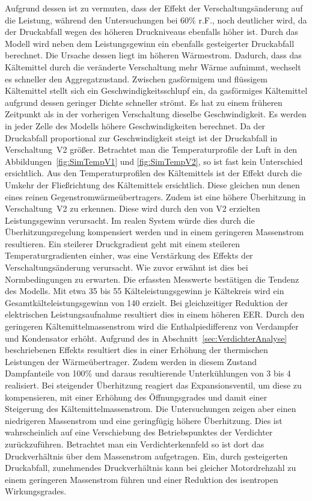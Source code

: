 Aufgrund dessen ist zu vermuten, dass der Effekt der Verschaltungsänderung auf die Leistung, während den Untersuchungen bei \unit{60}{\%} r.F., noch deutlicher wird, da der Druckabfall wegen des höheren Druckniveaus ebenfalls höher ist. Durch das Modell wird neben dem Leistungsgewinn ein ebenfalls gesteigerter Druckabfall berechnet. Die Ursache dessen liegt im höheren Wärmestrom. Dadurch, dass das Kältemittel durch die veränderte Verschaltung mehr Wärme aufnimmt, wechselt es schneller den Aggregatzustand. Zwischen gasförmigem und flüssigem Kältemittel stellt sich ein Geschwindigkeitsschlupf ein, da gasförmiges Kältemittel aufgrund dessen geringer Dichte schneller strömt. Es hat zu einem früheren Zeitpunkt als in der vorherigen Verschaltung dieselbe Geschwindigkeit. Es werden in jeder Zelle des Modells höhere Geschwindigkeiten berechnet. Da der Druckabfall proportional zur Geschwindigkeit steigt ist der Druckabfall in Verschaltung~V2 größer. \newline
Betrachtet man die Temperaturprofile der Luft in den Abbildungen~\ref{fig:SimTempV1} und \ref{fig:SimTempV2}, so ist fast kein Unterschied ersichtlich. Aus den Temperaturprofilen des Kältemittels ist der Effekt durch die Umkehr der Fließrichtung des Kältemittels ersichtlich. Diese gleichen nun denen eines reinen Gegenstromwärmeübertragers. Zudem ist eine höhere Überhitzung in Verschaltung~V2 zu erkennen. Diese wird durch den von V2 erzielten Leistungsgewinn verursacht. Im realen System würde dies durch die Überhitzungsregelung kompensiert werden und in einem geringeren Massenstrom resultieren. Ein steilerer Druckgradient geht mit einem steileren Temperaturgradienten einher, was eine Verstärkung des Effekts der Verschaltungsänderung verursacht. Wie zuvor erwähnt ist dies bei Normbedingungen zu erwarten. \newline
Die erfassten Messwerte bestätigen die Tendenz des Modells. Mit etwa \unit{35}{\watt} bis \unit{55}{\watt} Kälteleistungsgewinn je Kältekreis wird ein Gesamtkälteleistungsgewinn von \unit{140}{\watt} erzielt. Bei gleichzeitiger Reduktion der elektrischen Leistungsaufnahme resultiert dies in einem höheren EER. Durch den geringeren Kältemittelmassenstrom wird die Enthalpiedifferenz von Verdampfer und Kondensator erhöht. Aufgrund des in Abschnitt~\ref{sec:VerdichterAnalyse} beschriebenen Effekts resultiert dies in einer Erhöhung der thermischen Leistungen der Wärmeübertrager. Zudem werden in diesem Zustand Dampfanteile von \unit{100}{\%} und daraus resultierende Unterkühlungen von \unit{3}{\kelvin} bis \unit{4}{\kelvin} realisiert.
Bei steigender Überhitzung reagiert das Expansionsventil, um diese zu kompensieren, mit einer Erhöhung des Öffnungsgrades und damit einer Steigerung des Kältemittelmassenstrom. Die Untersuchungen zeigen aber einen niedrigeren Massenstrom und eine geringfügig höhere Überhitzung. Dies ist wahrscheinlich auf eine Verschiebung des Betriebspunktes der Verdichter zurückzuführen. Betrachtet man ein Verdichterkennfeld so ist dort das Druckverhältnis über dem Massenstrom aufgetragen. Ein, durch gesteigerten Druckabfall, zunehmendes Druckverhältnis kann bei gleicher Motordrehzahl zu einem geringeren Massenstrom führen und einer Reduktion des isentropen Wirkungsgrades. \newline

